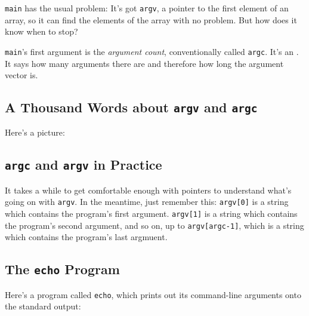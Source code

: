 {\tt main} has the usual problem: It's got {\tt argv}, a pointer to the
first element of an array, so it can find the elements of the array with
no problem.  But how does it know when to stop?

{\tt main}'s first argument is the {\em argument count}\/,
conventionally called {\tt argc}.  It's an \int.  It says how many
arguments there are and therefore how long the argument vector is.

\subsection{A Thousand Words about {\tt argv} and {\tt argc}}

Here's a picture:

\vspace{3in}

\subsection{{\tt argc} and {\tt argv} in Practice}

It takes a while to get comfortable enough with pointers to understand
what's going on with {\tt argv}.  In the meantime, just remember this:
{\tt argv[0]} is a string which contains the program's first argument.
{\tt argv[1]} is a string which contains the program's second argument,
and so on, up to {\tt argv[argc-1]}, which is a string which contains
the program's last argmuent.

\subsection{The {\tt echo} Program}

Here's a program called {\tt echo}, which prints out its command-line
arguments onto the standard output:


